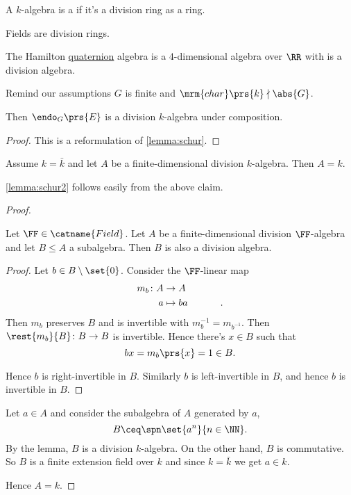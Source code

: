 \documentclass[10pt,a4paper,twoside,openany,hidelinks]{book}
\begin{document}
\begin{definition}
A $k$-algebra is a  if it's a division ring as a ring.
\end{definition}

\begin{example}
\item Fields are division rings.

\item The Hamilton \href{https://en.wikipedia.org/wiki/Quaternion}{quaternion} algebra is a $4$-dimensional algebra over $\RR$ with is a division algebra. 
\end{example}

\begin{lemma}[Schur] \label{lemma:schur3}
Remind our assumptions $G$ is finite and $\mrm{char}\prs{k} \nmid \abs{G}$.

Then $\endo_G\prs{E}$ is a division $k$-algebra under composition.
\end{lemma}

\begin{proof}
This is a reformulation of \ref{lemma:schur}.
\end{proof}

\begin{claim}
Assume $k = \bar{k}$ and let $A$ be a finite-dimensional division $k$-algebra. Then $A = k$.
\end{claim}

\begin{remark}
\ref{lemma:schur2} follows easily from the above claim.
\end{remark}

\begin{proof}
\begin{lemma}
Let $\FF \in \catname{Field}$.
Let $A$ be a finite-dimensional division $\FF$-algebra and let $B \leq A$ a subalgebra. Then $B$ is also a division algebra.
\end{lemma}
\begin{proof}
Let $b \in B \setminus \set{0}$. Consider the $\FF$-linear map
\begin{align*}
m_b \colon A &\to A \\
a &\mapsto ba \hphantom{lalalala} \text{.}
\end{align*}
Then $m_b$ preserves $B$ and is invertible with $m_b^{-1} = m_{b^{-1}}$.
Then
$\rest{m_b}{B} \colon B \to B$ is invertible.
Hence there's $x \in B$ such that \[bx = m_b\prs{x} = 1 \in B \text{.}\]

Hence $b$ is right-invertible in $B$.
Similarly $b$ is left-invertible in $B$, and hence $b$ is invertible in $B$.
\end{proof}

Let $a \in A$ and consider the subalgebra of $A$ generated by $a$,
\[B \ceq \spn \set{a^n}{n \in \NN} \text{.}\]
By the lemma, $B$ is a division $k$-algebra.
On the other hand, $B$ is commutative. So $B$ is a finite extension field over $k$ and since $k = \bar{k}$ we get $a \in k$.

Hence $A = k$.
\end{proof}
\end{document}
